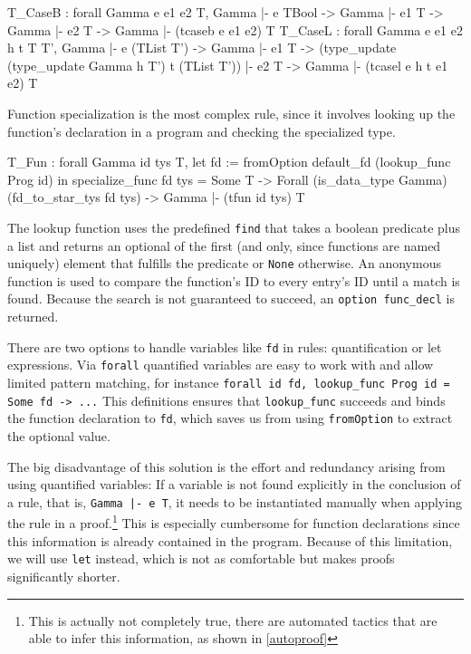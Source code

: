 \documentclass[fleqn, abstract=on]{scrreprt}
\newcommand{\coqinline}[1]{\texttt{#1}}
\begin{document}
\begin{coqcode}
T_CaseB : forall Gamma e e1 e2 T,
            Gamma |- e \in TBool -> Gamma |- e1 \in T -> Gamma |- e2 \in T ->
            Gamma |- (tcaseb e e1 e2) \in T
T_CaseL : forall Gamma e e1 e2 h t T T',
            Gamma |- e \in (TList T') -> Gamma |- e1 \in T ->
            (type_update (type_update Gamma h T') t (TList T')) |- e2 \in T ->
            Gamma |- (tcasel e h t e1 e2) \in T
\end{coqcode}
Function specialization is the most complex rule, since it involves looking up the function's declaration in a program and checking the specialized type.
\begin{coqcode}
T_Fun : forall Gamma id tys T,
          let fd := fromOption default_fd (lookup_func Prog id) in 
          specialize_func fd tys = Some T ->
          Forall (is_data_type Gamma) (fd_to_star_tys fd tys) ->
          Gamma |- (tfun id tys) \in T
\end{coqcode}
The lookup function uses the predefined \coqinline{find} that takes a boolean predicate plus a list and returns an optional of the first (and only, since functions are named uniquely) element that fulfills the predicate or \coqinline{None} otherwise. An anonymous function is used to compare the function's ID to every entry's ID until a match is found. Because the search is not guaranteed to succeed, an \coqinline{option func_decl} is returned. 
\par 
There are two options to handle variables like \texttt{fd} in rules: quantification or let expressions. Via \coqinline{forall} quantified variables are easy to work with and allow limited pattern matching, for instance \coqinline{forall id fd, lookup_func Prog id = Some fd -> ...} This definitions ensures that \coqinline{lookup_func} succeeds and binds the function declaration to \coqinline{fd}, which saves us from using \coqinline{fromOption} to extract the optional value.
\par
 The big disadvantage of this solution is the effort and redundancy arising from using quantified variables: If a variable is not found explicitly in the conclusion of a rule, that is, \coqinline{Gamma |- e \in T}, it needs to be instantiated manually when applying the rule in a proof.\footnote{This is actually not completely true, there are automated tactics that are able to infer this information, as shown in \autoref{autoproof}} This is especially cumbersome for function declarations since this information is already contained in the program. Because of this limitation, we will use \coqinline{let} instead, which is not as comfortable but makes proofs significantly shorter.
\end{document}
